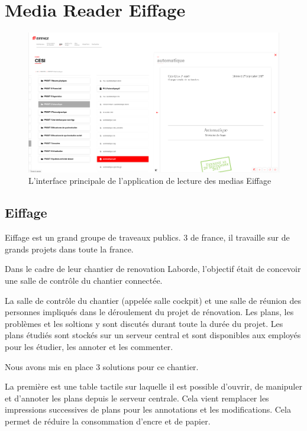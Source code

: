 \section{Media Reader Eiffage}

\begin{figure}[h]
    \centering
    \includegraphics[scale=0.5]{img/media-reader.png}
    \caption{L'interface principale de l'application de lecture des medias Eiffage}
\end{figure}

\subsection{Eiffage}

Eiffage est un grand groupe de traveaux publics.
3 de france, il travaille sur de grands projets dans toute la france.

Dans le cadre de leur chantier de renovation Laborde, l'objectif était de concevoir une salle de contrôle du chantier connectée.

La salle de contrôle du chantier (appelée salle cockpit) et une salle de réunion des personnes impliqués dans le déroulement du projet de rénovation.
Les plans, les problèmes et les soltions y sont discutés durant toute la durée du projet.
Les plans étudiés sont stockés sur un serveur central et sont disponibles aux employés pour les étudier, les annoter et les commenter.

\medskip

Nous avons mis en place 3 solutions pour ce chantier.

La première est une table tactile sur laquelle il est possible d'ouvrir, de manipuler et d'annoter les plans depuis le serveur centrale.
Cela vient remplacer les impressions successives de plans pour les annotations et les modifications.
Cela permet de réduire la consommation d'encre et de papier.

